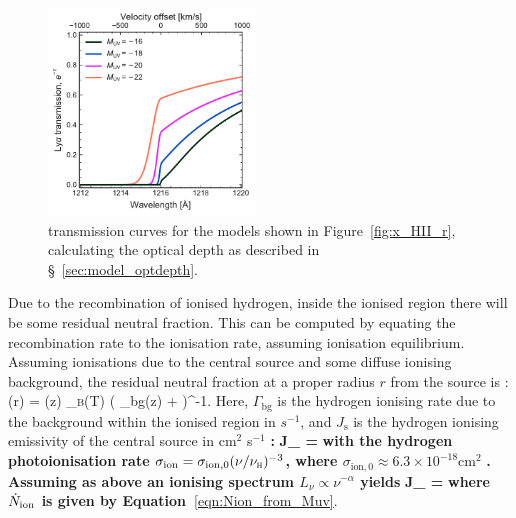 \documentclass[fleqn,usenatbib]{mnras}
\providecommand{\DIFadd}[1]{{\protect\color{Green} {\bf #1}}} %
\providecommand{\DIFaddbegin}{} %
\providecommand{\DIFaddend}{} %
\newcommand{\DIFaddincludegraphics}[2][]{{\color{purple}\fbox{\DIFOincludegraphics[#1]{#2}}}} %
\DeclareRobustCommand{\DIFaddbegin}{\DIFOaddbegin \let\includegraphics\DIFaddincludegraphics} %
\DeclareRobustCommand{\DIFaddend}{\DIFOaddend \let\includegraphics\DIFOincludegraphics} %
\begin{document}
\begin{figure}
    \includegraphics[width=0.49\textwidth]{figs/fig3.pdf}
    \caption{\lya transmission curves for the models shown in Figure~\ref{fig:x_HII_r}, calculating the optical depth as described in \S~\ref{sec:model_optdepth}.}
    \label{fig:transmission_Muv}
\end{figure}
Due to the recombination of ionised hydrogen, inside the ionised region there will be some residual neutral fraction. This can be computed by equating the recombination rate to the ionisation rate, assuming ionisation equilibrium. Assuming ionisations due to the central source and some diffuse ionising background, the residual neutral fraction at a proper radius $r$ from the source is \citep[e.g.,][]{Mesinger2004}:
%
\BE \label{eqn:HII_xHI}
\xHI(r) = \clump \DIFaddbegin \DIFadd{\Delta }\DIFaddend \nh(z) \alpha_\textsc{b}(T) \left( \Gamma_\textrm{bg}(z) +  \right)^{-1}.
\EE
%
Here, $\Gamma_\textrm{bg}$ is the hydrogen ionising rate due to the background within the ionised region in $s^{-1}$, and $J_\mathrm{s}$ is the hydrogen ionising emissivity of the central source in cm$^2$ s$^{-1}$\DIFaddbegin \DIFadd{:
}\BE \label{eqn:HII_gammasource}
\DIFadd{J_ = }\fesc \DIFadd{\int_{\nu_\textsc{h}}^\infty \,}\dd\DIFadd{\nu \, \frac{L_\nu}{h\nu} \sigma_\mathrm{ion}(\nu)
}\EE
\DIFadd{with the hydrogen photoionisation rate $\sigma_\mathrm{ion} = \sigma_{\mathrm{ion},0} (\nu/\nu_\textsc{h})^{-3}$, where $\sigma_{\mathrm{ion},0} \approx 6.3\times10^{-18}\textrm{cm}^2$ }\citep[e.g.,][]{Draine2011}\DIFadd{. Assuming as above an ionising spectrum $L_\nu \propto \nu^{-\alpha}$ yields
}\BE \label{eqn:HII_gammasource_Nion}
\DIFadd{J_ = }\fesc  \Nion \DIFadd{\frac{\alpha}{\alpha + 3} \sigma_{\mathrm{ion},0}
}\EE
\DIFadd{where $\Nion$ is given by Equation~}\eqref{eqn:Nion_from_Muv}\DIFaddend . 
\DIFaddbegin 
\end{document}
